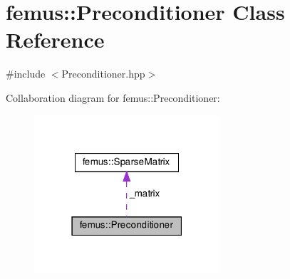 \hypertarget{classfemus_1_1_preconditioner}{}\section{femus\+:\+:Preconditioner Class Reference}
\label{classfemus_1_1_preconditioner}


{\ttfamily \#include $<$Preconditioner.\+hpp$>$}



Collaboration diagram for femus\+:\+:Preconditioner\+:
\nopagebreak
\begin{figure}[H]
\begin{center}
\leavevmode
\includegraphics[width=195pt]{classfemus_1_1_preconditioner__coll__graph}
\end{center}
\end{figure}

